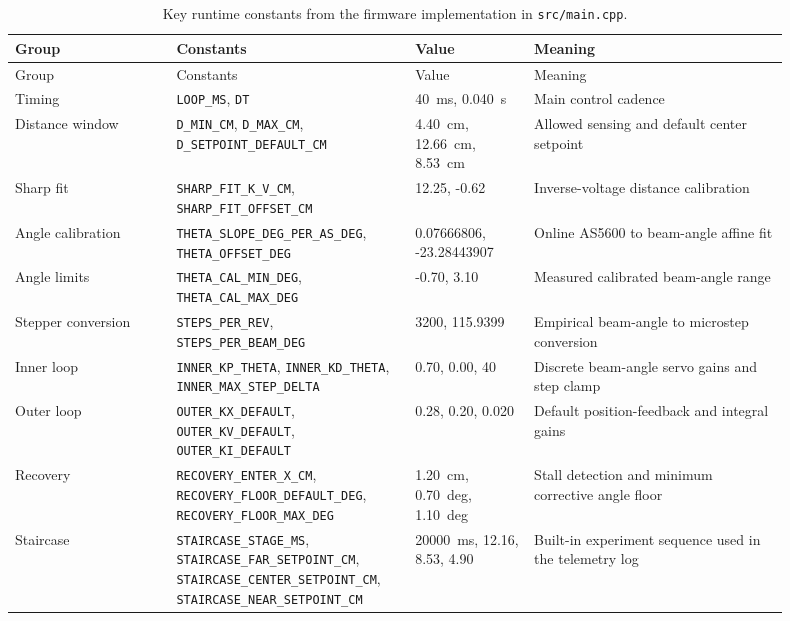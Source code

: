 \small
\begin{longtable}{@{}p{0.19\linewidth}p{0.27\linewidth}p{0.14\linewidth}p{0.30\linewidth}@{}}
\caption{Key runtime constants from the firmware implementation in \texttt{src/main.cpp}.}
\label{tab:implementation_constants}\\
\toprule
Group & Constants & Value & Meaning \\
\midrule
\endfirsthead
\toprule
Group & Constants & Value & Meaning \\
\midrule
\endhead
\bottomrule
\endfoot
Timing & \verb|LOOP_MS|, \verb|DT| & \SI{40}{ms}, \SI{0.040}{s} & Main control cadence \\
Distance window & \verb|D_MIN_CM|, \verb|D_MAX_CM|, \verb|D_SETPOINT_DEFAULT_CM| & \SI{4.40}{cm}, \SI{12.66}{cm}, \SI{8.53}{cm} & Allowed sensing and default center setpoint \\
Sharp fit & \verb|SHARP_FIT_K_V_CM|, \verb|SHARP_FIT_OFFSET_CM| & 12.25, -0.62 & Inverse-voltage distance calibration \\
Angle calibration & \verb|THETA_SLOPE_DEG_PER_AS_DEG|, \verb|THETA_OFFSET_DEG| & 0.07666806, -23.28443907 & Online AS5600 to beam-angle affine fit \\
Angle limits & \verb|THETA_CAL_MIN_DEG|, \verb|THETA_CAL_MAX_DEG| & -0.70, 3.10 & Measured calibrated beam-angle range \\
Stepper conversion & \verb|STEPS_PER_REV|, \verb|STEPS_PER_BEAM_DEG| & 3200, 115.9399 & Empirical beam-angle to microstep conversion \\
Inner loop & \verb|INNER_KP_THETA|, \verb|INNER_KD_THETA|, \verb|INNER_MAX_STEP_DELTA| & 0.70, 0.00, 40 & Discrete beam-angle servo gains and step clamp \\
Outer loop & \verb|OUTER_KX_DEFAULT|, \verb|OUTER_KV_DEFAULT|, \verb|OUTER_KI_DEFAULT| & 0.28, 0.20, 0.020 & Default position-feedback and integral gains \\
Recovery & \verb|RECOVERY_ENTER_X_CM|, \verb|RECOVERY_FLOOR_DEFAULT_DEG|, \verb|RECOVERY_FLOOR_MAX_DEG| & \SI{1.20}{cm}, \SI{0.70}{deg}, \SI{1.10}{deg} & Stall detection and minimum corrective angle floor \\
Staircase & \verb|STAIRCASE_STAGE_MS|, \verb|STAIRCASE_FAR_SETPOINT_CM|, \verb|STAIRCASE_CENTER_SETPOINT_CM|, \verb|STAIRCASE_NEAR_SETPOINT_CM| & \SI{20000}{ms}, 12.16, 8.53, 4.90 & Built-in experiment sequence used in the telemetry log \\
\end{longtable}
\normalsize
